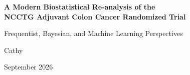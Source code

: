 \documentclass[11pt,a4paper]{article}
\begin{document}
\begin{center}
    {\LARGE\bfseries A Modern Biostatistical Re-analysis of the\\
     NCCTG Adjuvant Colon Cancer Randomized Trial\par}

    \vspace{0.9em}
    {\large Frequentist, Bayesian, and Machine Learning Perspectives\par}

    \vspace{1.4em}
    {\large Cathy\par}

    \vspace{0.4em}
    {\small September 2026\par}
\end{center}

\vspace{0.6em}
\end{document}
